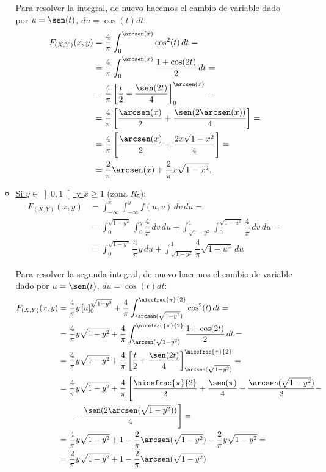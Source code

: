 \begin{ejercicio}
\begin{enumerate}
\begin{itemize}
            Para resolver la integral, de nuevo hacemos el cambio de variable dado por $u=\sen(t)$, $du=\cos(t)dt$:
            \begin{align*}
                F_{(X,Y)}(x, y) &= \dfrac{4}{\pi}\int_{0}^{\arcsen(x)} \cos^2(t) \, dt
                =\\&= \dfrac{4}{\pi}\int_{0}^{\arcsen(x)} \dfrac{1+\cos(2t)}{2} \, dt
                =\\&= \dfrac{4}{\pi}\left[\dfrac{t}{2}+\dfrac{\sen(2t)}{4}\right]_0^{\arcsen(x)}
                =\\&= \dfrac{4}{\pi}\left[\dfrac{\arcsen(x)}{2}+\dfrac{\sen(2\arcsen(x))}{4}\right]
                =\\&= \dfrac{4}{\pi}\left[\dfrac{\arcsen(x)}{2}+\dfrac{2x\sqrt{1-x^2}}{4}\right]
                =\\&= \dfrac{2}{\pi}\arcsen(x)+\dfrac{2}{\pi}x\sqrt{1-x^2}.
            \end{align*}

            \item \ul{Si $y\in \left]0,1\right[$ \quad y \quad $x\geq 1$} (zona $R_5$):
            \begin{align*}
                F_{(X,Y)}(x, y) &= \int_{-\infty}^x \int_{-\infty}^y f(u, v) \, dv \, du =\\
                &= \int_{0}^{\sqrt{1-y^2}} \int_{0}^y \dfrac{4}{\pi} \, dv \, du + \int_{\sqrt{1-y^2}}^1 \int_{0}^{\sqrt{1-u^2}} \dfrac{4}{\pi} \, dv \, du
                =\\&= \int_{0}^{\sqrt{1-y^2}} \dfrac{4}{\pi}y \, du + \int_{\sqrt{1-y^2}}^1 \dfrac{4}{\pi}\sqrt{1-u^2} \, du
            \end{align*}

            Para resolver la segunda integral, de nuevo hacemos el cambio de variable dado por $u=\sen(t)$, $du=\cos(t)dt$:
            \begin{align*}
                F_{(X,Y)}(x, y) &= \dfrac{4}{\pi}y\left[u\right]_0^{\sqrt{1-y^2}} + \dfrac{4}{\pi}\int_{\arcsen(\sqrt{1-y^2})}^{\nicefrac{\pi}{2}} \cos^2(t) \, dt
                =\\&= \dfrac{4}{\pi}y\sqrt{1-y^2} + \dfrac{4}{\pi}\int_{\arcsen(\sqrt{1-y^2})}^{\nicefrac{\pi}{2}} \dfrac{1+\cos(2t)}{2} \, dt
                =\\&= \dfrac{4}{\pi}y\sqrt{1-y^2} + \dfrac{4}{\pi}\left[\dfrac{t}{2}+\dfrac{\sen(2t)}{4}\right]_{\arcsen(\sqrt{1-y^2})}^{\nicefrac{\pi}{2}}
                =\\&= \dfrac{4}{\pi}y\sqrt{1-y^2} + \dfrac{4}{\pi}\left[\dfrac{\nicefrac{\pi}{2}}{2}+\dfrac{\sen(\pi)}{4}-\dfrac{\arcsen(\sqrt{1-y^2})}{2}-\right.\\&\qquad\left.-\dfrac{\sen(2\arcsen(\sqrt{1-y^2}))}{4}\right]
                =\\&= \dfrac{4}{\pi}y\sqrt{1-y^2} + 1 - \dfrac{2}{\pi}\arcsen(\sqrt{1-y^2}) - \dfrac{2}{\pi}y\sqrt{1-y^2}
                =\\&= \dfrac{2}{\pi}y\sqrt{1-y^2} + 1 - \dfrac{2}{\pi}\arcsen(\sqrt{1-y^2})
            \end{align*}


\end{itemize}
\end{enumerate}
\end{ejercicio}
